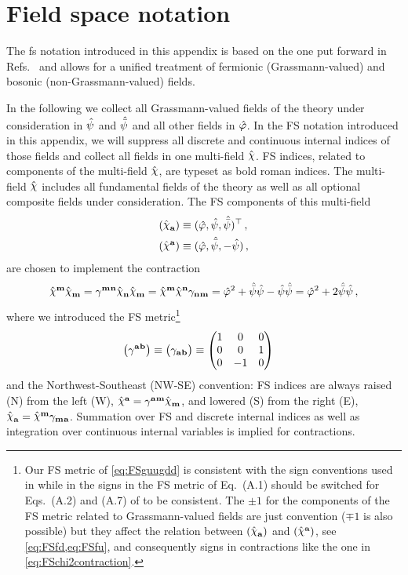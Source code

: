 \section{Field space notation}\label{app:FS}
The \acrlong{fs}{} notation introduced in this appendix is based on the one put forward in Refs.~\cite{Pawlowski:2005xe,Rennecke:2015lur,PawlowskiScript} and allows for a unified treatment of fermionic (Grassmann-valued) and bosonic (non-Grassmann-valued) fields.\bigskip

In the following we collect all Grassmann-valued fields of the theory under consideration in $\hat{\psi}$ and $\hat{\bar{\psi}}$ and all other fields in $\hat{\varphi}$.
In the FS notation introduced in this appendix, we will suppress all discrete and continuous internal indices of those fields and collect all fields in one multi-field $\FSf{\chi}$.
FS indices, related to components of the multi-field $\FSf{\chi}$, are typeset as bold roman indices.
The multi-field $\FSf{\chi}$ includes all fundamental fields of the theory as well as 
all optional composite fields under consideration.
The FS components of this multi-field
\begin{align}
	(\FSfd{\FSsf}{a})&\equiv (\FSf{\MFphi},\FSf{\MFpsi},\FSf{\MFpsib})^\tr \, ,\label{eq:FSfd}\\
	(\FSfu{\FSsf}{a})&\equiv (\FSf{\MFphi},\FSf{\MFpsib},-\FSf{\MFpsi}) \, ,\label{eq:FSfu}
\end{align}
are chosen to implement the contraction
\begin{align}
	\FSfu{\FSsf}{m}\FSfd{\FSsf}{m}
		=\FSguu{m}{n}\FSfd{\FSsf}{n}\FSfd{\FSsf}{m}
		=\FSfu{\FSsf}{m}\FSfu{\FSsf}{n}\FSgdd{n}{m}
		=\FSf{\MFphi}^2+\FSf{\MFpsib}\FSf{\MFpsi}-\FSf{\MFpsi}\FSf{\MFpsib}=\FSf{\MFphi}^2+2\FSf{\MFpsib}\FSf{\MFpsi} \, ,\label{eq:FSchi2contraction}
\end{align}
where we introduced the FS metric\footnote{%
	Our FS metric of \cref{eq:FSguugdd} is consistent with the sign conventions used in  while in  the signs in the FS metric of Eq.~(A.1) should be switched for Eqs.~(A.2) and (A.7) of  to be consistent.
	The $\pm1$ for the components of the FS metric related to Grassmann-valued fields are just convention ($\mp1$ is also possible) but they affect the relation between $(\FSfd{\FSsf}{a})$ and $(\FSfu{\FSsf}{a})$, see \cref{eq:FSfd,eq:FSfu}, and consequently signs in contractions like the one in \cref{eq:FSchi2contraction}.%
}
\begin{align}
	\del[1]{\FSguu{a}{b}}&\equiv\del[1]{\FSgdd{a}{b}}\equiv
		\begin{pmatrix}
			1 & 0 & 0\\
			0 & 0 & 1\\
			0 & -1 & 0
		\end{pmatrix}\label{eq:FSguugdd}
\end{align}
and the Northwest-Southeast (NW-SE) convention: FS indices are always raised (N) from the left (W), $\FSfu{\FSsf}{a}= \FSguu{a}{m}\FSfd{\FSsf}{m}$, and  lowered (S) from the right (E), $\FSfd{\FSsf}{a}= \FSfu{\FSsf}{m}\FSgdd{m}{a}$.
Summation over FS and discrete internal indices as well as integration over continuous internal variables is implied for contractions.

